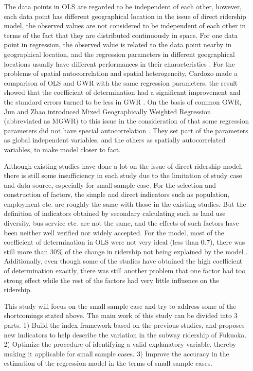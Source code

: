 The data points in OLS are regarded to be independent of each other, however, each data point has different geographical location in the issue of direct ridership model, the observed values are not considered to be independent of each other in terms of the fact that they are distributed continuously in space. For one data point in regression, the observed value is related to the data point nearby in geographical location, and the regression parameters in different geographical locations usually have different performances in their characteristics \cite{brunsdon1996geographically}. For the problems of spatial autocorrelation and spatial heterogeneity, Cardozo made a comparison of OLS and GWR with the same regression parameters, the result showed that the coefficient of determination had a significant improvement and the standard errors turned to be less in GWR \cite{cardozo2012application}. On the basis of common GWR, Jun and Zhao introduced Mixed Geographically Weighted Regression (abbreviated as MGWR) to this issue in the consideration of that some regression parameters did not have special autocorrelation \cite{jun2015land,zhao2005transit}. They set part of the parameters as global independent variables, and the others as spatially autocorrelated variables, to make model closer to fact.

Although existing studies have done a lot on the issue of direct ridership model, there is still some insufficiency in each study due to the limitation of study case and data source, especially for small sample case. For the selection and construction of factors, the simple and direct indicators such as population, employment etc. are roughly the same with those in the existing studies. But the definition of indicators obtained by secondary calculating such as land use diversity, bus service etc. are not the same, and the effects of such factors have been neither well verified nor widely accepted. For the model, most of the coefficient of determination in OLS were not very ideal (less than 0.7), there was still more than 30\% of the change in ridership not being explained by the model \cite{gutierrez2011transit,jun2015land}. Additionally, even though some of the studies have obtained the high coefficient of determination exactly, there was still another problem that one factor had too strong effect while the rest of the factors had very little influence on the ridership.

This study will focus on the small sample case and try to address some of the shortcomings stated above. The main work of this study can be divided into 3 parts. 1) Build the index framework based on the previous studies, and proposes new indicators to help describe the variation in the subway ridership of Fukuoka. 2) Optimize the procedure of identifying a valid explanatory variable, thereby making it applicable for small sample cases. 3) Improve the accuracy in the estimation of the regression model in the terms of small sample cases.

